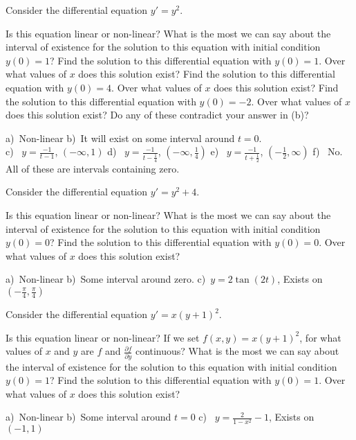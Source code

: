 \begin{exercise}
Consider the differential equation $y' = y^2$. 
\begin{tasks}
\task Is this equation linear or non-linear?
\task What is the most we can say about the interval of existence for the solution to this equation with initial condition $y(0) = 1$?
\task Find the solution to this differential equation with $y(0) = 1$. Over what values of $x$ does this solution exist?
\task Find the solution to this differential equation with $y(0) = 4$. Over what values of $x$ does this solution exist?
\task Find the solution to this differential equation with $y(0) = -2$. Over what values of $x$ does this solution exist?
\task Do any of these contradict your answer in (b)? 
\end{tasks}
\end{exercise}
\comboSol{%
}
{%
a)~Non-linear \quad b)~It will exist on some interval around $t=0$. \\ c)~ $y = \frac{-1}{t-1}$, $(-\infty, 1)$ \quad d)~ $y = \frac{-1}{t - \frac{1}{4}}$, $\left(-\infty, \frac{1}{4}\right)$ \quad e)~ $y = \frac{-1}{t+\frac{1}{2}}$, $(-\frac{1}{2}, \infty)$ \quad
f)~ No. All of these are intervals containing zero.
}

\begin{exercise}
Consider the differential equation $y' = y^2 + 4$. 
\begin{tasks}
\task Is this equation linear or non-linear?
\task What is the most we can say about the interval of existence for the solution to this equation with initial condition $y(0) = 0$?
\task Find the solution to this differential equation with $y(0) = 0$. Over what values of $x$ does this solution exist?
\end{tasks}
\end{exercise}
\comboSol{%
}
{%
a)~Non-linear \quad b)~Some interval around zero. \quad c)~$y = 2\tan(2t)$, Exists on $\left(-\frac{\pi}{4}, \frac{\pi}{4}\right)$
}

\begin{exercise}
Consider the differential equation $y' = x(y+1)^2$. 
\begin{tasks}
\task Is this equation linear or non-linear?
\task If we set $f(x,y) = x(y+1)^2$, for what values of $x$ and $y$ are $f$ and $\frac{\partial f}{\partial y}$ continuous?
\task What is the most we can say about the interval of existence for the solution to this equation with initial condition $y(0) = 1$?
\task Find the solution to this differential equation with $y(0) = 1$. Over what values of $x$ does this solution exist?
\end{tasks}
\end{exercise}
\comboSol{%
}
{%
a)~Non-linear \qquad b)~Some interval around $t=0$ \quad c)~ $y = \frac{2}{1-x^2} - 1$, Exists on $(-1, 1)$
}


